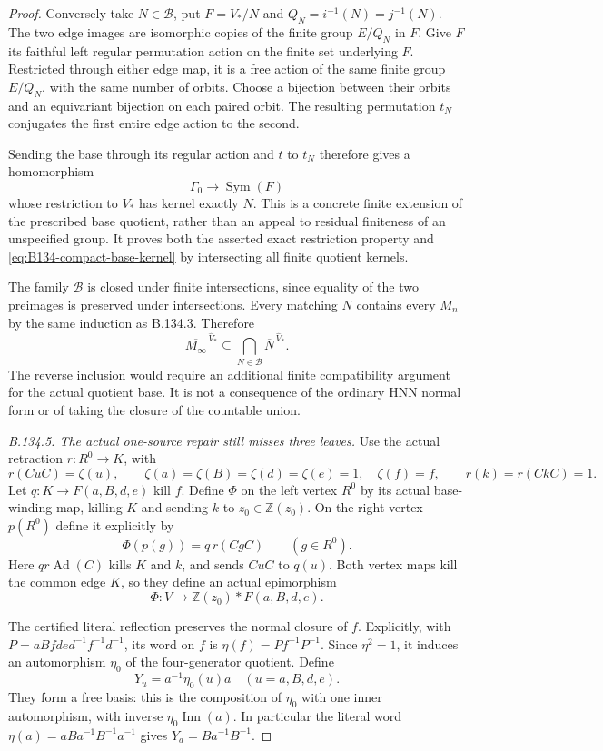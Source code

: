 \begin{proof}
Conversely take $N\in\mathcal B$, put $F=V_*/N$ and
$Q_N=i^{-1}(N)=j^{-1}(N)$. The two edge images are isomorphic
copies of the finite group $E/Q_N$ in $F$. Give $F$ its faithful
left regular permutation action on the finite set underlying $F$.
Restricted through either edge map, it is a free action of the
same finite group $E/Q_N$, with the same number of orbits.
Choose a bijection between their orbits and an equivariant
bijection on each paired orbit. The resulting permutation
$t_N$ conjugates the first entire edge action to the second.

Sending the base through its regular action and $t$ to $t_N$
therefore gives a homomorphism
\[
 \Gamma_0\longrightarrow\operatorname{Sym}(F)
\]
whose restriction to $V_*$ has kernel exactly $N$.
This is a concrete finite extension of the prescribed base
quotient, rather than an appeal to residual finiteness of an
unspecified group. It proves both the asserted exact restriction
property and \eqref{eq:B134-compact-base-kernel} by intersecting
all finite quotient kernels.

The family $\mathcal B$ is closed under finite intersections,
since equality of the two preimages is preserved under
intersections. Every matching $N$ contains every $M_n$ by the
same induction as B.134.3. Therefore
\[
 \overline{M_\infty}^{\,\widehat V_*}
       \subseteq\bigcap_{N\in\mathcal B}\overline N^{\,\widehat V_*}.
\]
The reverse inclusion would require an additional finite
compatibility argument for the actual quotient base. It is
not a consequence of the ordinary HNN normal form or of
taking the closure of the countable union.

\emph{B.134.5. The actual one-source repair still misses three leaves.}
Use the actual retraction $r:R^0\to K$, with
\[
 r(CuC)=\zeta(u),\qquad
 \zeta(a)=\zeta(B)=\zeta(d)=\zeta(e)=1,\quad\zeta(f)=f,
 \qquad r(k)=r(CkC)=1.
\]
Let $q:K\to F(a,B,d,e)$ kill $f$. Define $\Phi$ on the
left vertex $R^0$ by its actual base-winding map, killing $K$
and sending $k$ to $z_0\in\mathbb Z(z_0)$. On the right vertex
$p(R^0)$ define it explicitly by
\[
 \Phi(p(g))=q\,r(CgC)\qquad(g\in R^0).
\]
Here $q r\operatorname{Ad}(C)$ kills $K$ and $k$, and sends
$CuC$ to $q(u)$. Both vertex maps kill the common edge $K$,
so they define an actual epimorphism
\begin{equation}\label{eq:B134-Phi}
 \Phi:V\longrightarrow\mathbb Z(z_0)*F(a,B,d,e).
\end{equation}

The certified literal reflection preserves the normal closure
of $f$. Explicitly, with
$P=aBfde d^{-1}f^{-1}d^{-1}$, its word on $f$ is
$\eta(f)=Pf^{-1}P^{-1}$. Since $\eta^2=1$, it induces an
automorphism $\eta_0$ of the four-generator quotient.
Define
\[
 Y_u=a^{-1}\eta_0(u)a\quad(u=a,B,d,e).
\]
They form a free basis: this is the composition of $\eta_0$
with one inner automorphism, with inverse
$\eta_0\operatorname{Inn}(a)$. In particular the literal word
$\eta(a)=aBa^{-1}B^{-1}a^{-1}$ gives
$Y_a=Ba^{-1}B^{-1}$.


\end{proof}
